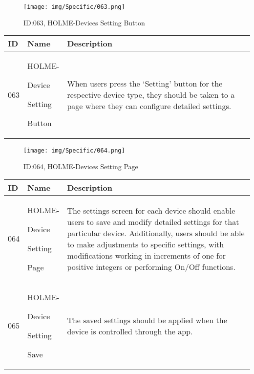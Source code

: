 \documentclass[conference]{IEEEtran}
\begin{document}
\begin{enumerate}
\vspace{3cm}
\begin{figure}[h]
\centering
\texttt{[image: img/Specific/063.png]}
\caption{ID:063, HOLME-Devices Setting Button}
\end{figure}
\begin{table}[h]
\def\arraystretch{1.2} \small
    \begin{tabular}{|p{1cm}|p{1.8cm}|p{5.0cm}|}
        \hline
        ID & Name & Description\\ \hline
         063 \par  & HOLME-\par Device \par Setting \par Button  & When users press the `Setting' button for the respective device type, they should be taken to a page where they can configure detailed settings. \\ \hline
    \end{tabular}
\end{table}

\begin{figure}[h]
\centering
\texttt{[image: img/Specific/064.png]}
\caption{ID:064, HOLME-Devices Setting Page}
\end{figure}
\begin{table}[h]
\def\arraystretch{1.2} \small
    \begin{tabular}{|p{1cm}|p{1.8cm}|p{5.0cm}|}
        \hline
        ID & Name & Description\\ \hline
         064 \par  & HOLME-\par Device \par Setting \par Page  & 
The settings screen for each device should enable users to save and modify detailed settings for that particular device. Additionally, users should be able to make adjustments to specific settings, with modifications working in increments of one for positive integers or performing On/Off functions. \\ \hline
         065 \par  & HOLME-\par Device \par Setting \par Save  & The saved settings should be applied when the device is controlled through the app. \\ \hline
    \end{tabular}
\end{table}
\clearpage


\end{enumerate}
\end{document}
